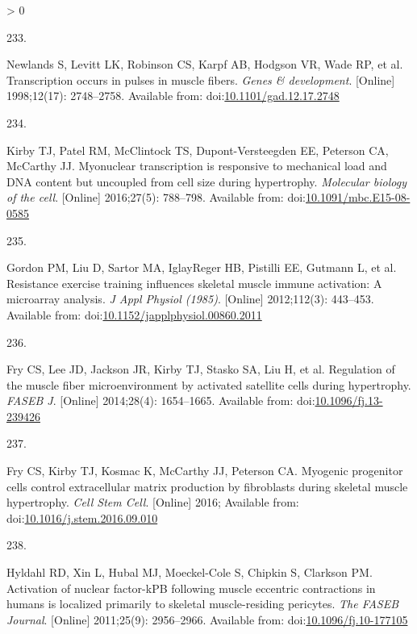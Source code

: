 \documentclass[twoside,10pt]{gihclass} %
\newlength{\cslhangindent}
\newlength{\csllabelwidth}
\newenvironment{CSLReferences}[3] %
 {%
  \setlength{\parindent}{0pt}
  \ifodd #1 \everypar{\setlength{\hangindent}{\cslhangindent}}\ignorespaces\fi
  \ifnum #2 > 0
  \setlength{\parskip}{#2\baselineskip}
  \fi
 }%
 {}
\newcommand{\CSLLeftMargin}[1]{\parbox[t]{\maxof{\widthof{#1}}{\csllabelwidth}}{#1}}
\newcommand{\CSLRightInline}[1]{\parbox[t]{\linewidth}{#1}}
\begin{document}
\begin{CSLReferences}{0}{0}
\leavevmode\hypertarget{ref-RN2618}{}%
\CSLLeftMargin{233. }
\CSLRightInline{Newlands S, Levitt LK, Robinson CS, Karpf AB, Hodgson VR, Wade RP, et al. Transcription occurs in pulses in muscle fibers. \emph{Genes \& development}. {[}Online{]} 1998;12(17): 2748--2758. Available from: doi:\href{https://doi.org/10.1101/gad.12.17.2748}{10.1101/gad.12.17.2748}}

\leavevmode\hypertarget{ref-RN2616}{}%
\CSLLeftMargin{234. }
\CSLRightInline{Kirby TJ, Patel RM, McClintock TS, Dupont-Versteegden EE, Peterson CA, McCarthy JJ. Myonuclear transcription is responsive to mechanical load and DNA content but uncoupled from cell size during hypertrophy. \emph{Molecular biology of the cell}. {[}Online{]} 2016;27(5): 788--798. Available from: doi:\href{https://doi.org/10.1091/mbc.E15-08-0585}{10.1091/mbc.E15-08-0585}}

\leavevmode\hypertarget{ref-RN1825}{}%
\CSLLeftMargin{235. }
\CSLRightInline{Gordon PM, Liu D, Sartor MA, IglayReger HB, Pistilli EE, Gutmann L, et al. Resistance exercise training influences skeletal muscle immune activation: A microarray analysis. \emph{J Appl Physiol (1985)}. {[}Online{]} 2012;112(3): 443--453. Available from: doi:\href{https://doi.org/10.1152/japplphysiol.00860.2011}{10.1152/japplphysiol.00860.2011}}

\leavevmode\hypertarget{ref-RN1354}{}%
\CSLLeftMargin{236. }
\CSLRightInline{Fry CS, Lee JD, Jackson JR, Kirby TJ, Stasko SA, Liu H, et al. Regulation of the muscle fiber microenvironment by activated satellite cells during hypertrophy. \emph{FASEB J}. {[}Online{]} 2014;28(4): 1654--1665. Available from: doi:\href{https://doi.org/10.1096/fj.13-239426}{10.1096/fj.13-239426}}

\leavevmode\hypertarget{ref-RN1888}{}%
\CSLLeftMargin{237. }
\CSLRightInline{Fry CS, Kirby TJ, Kosmac K, McCarthy JJ, Peterson CA. Myogenic progenitor cells control extracellular matrix production by fibroblasts during skeletal muscle hypertrophy. \emph{Cell Stem Cell}. {[}Online{]} 2016; Available from: doi:\href{https://doi.org/10.1016/j.stem.2016.09.010}{10.1016/j.stem.2016.09.010}}

\leavevmode\hypertarget{ref-RN2408}{}%
\CSLLeftMargin{238. }
\CSLRightInline{Hyldahl RD, Xin L, Hubal MJ, Moeckel-Cole S, Chipkin S, Clarkson PM. Activation of nuclear factor-kPB following muscle eccentric contractions in humans is localized primarily to skeletal muscle-residing pericytes. \emph{The FASEB Journal}. {[}Online{]} 2011;25(9): 2956--2966. Available from: doi:\href{https://doi.org/10.1096/fj.10-177105}{10.1096/fj.10-177105}}


\end{CSLReferences}
\end{document}
